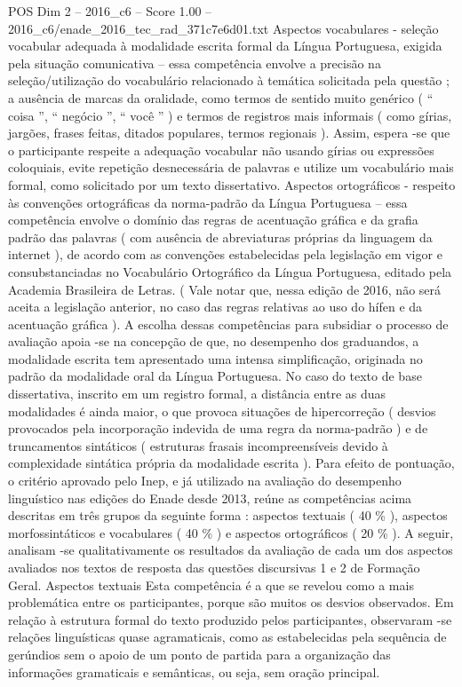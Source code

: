 \begin{textsample}{POS Dim 2 – 2016\_c6 – Score 1.00 – 2016\_c6/enade\_2016\_tec\_rad\_371c7e6d01.txt}
Aspectos vocabulares - seleção vocabular adequada à modalidade escrita formal da Língua Portuguesa, exigida pela situação comunicativa – essa competência envolve a precisão na seleção/utilização do vocabulário relacionado à temática solicitada pela questão ; a ausência de marcas da oralidade, como termos de sentido muito genérico ( “ coisa ”, “ negócio ”, “ você ” ) e termos de registros mais informais ( como gírias, jargões, frases feitas, ditados populares, termos regionais ).
Assim, espera -se que o participante respeite a adequação vocabular não usando gírias ou expressões coloquiais, evite repetição desnecessária de palavras e utilize um vocabulário mais formal, como solicitado por um texto dissertativo.
Aspectos ortográficos - respeito às convenções ortográficas da norma-padrão da Língua Portuguesa – essa competência envolve o domínio das regras de acentuação gráfica e da grafia padrão das palavras ( com ausência de abreviaturas próprias da linguagem da internet ), de acordo com as convenções estabelecidas pela legislação em vigor e consubstanciadas no Vocabulário Ortográfico da Língua Portuguesa, editado pela Academia Brasileira de Letras. ( Vale notar que, nessa edição de 2016, não será aceita a legislação anterior, no caso das regras relativas ao uso do hífen e da acentuação gráfica ).
A escolha dessas competências para subsidiar o processo de avaliação apoia -se na concepção de que, no desempenho dos graduandos, a modalidade escrita tem apresentado uma intensa simplificação, originada no padrão da modalidade oral da Língua Portuguesa.
No caso do texto de base dissertativa, inscrito em um registro formal, a distância entre as duas modalidades é ainda maior, o que provoca situações de hipercorreção ( desvios provocados pela incorporação indevida de uma regra da norma-padrão ) e de truncamentos sintáticos ( estruturas frasais incompreensíveis devido à complexidade sintática própria da modalidade escrita ).
Para efeito de pontuação, o critério aprovado pelo Inep, e já utilizado na avaliação do desempenho linguístico nas edições do Enade desde 2013, reúne as competências acima descritas em três grupos da seguinte forma : aspectos textuais ( 40 \% ), aspectos morfossintáticos e vocabulares ( 40 \% ) e aspectos ortográficos ( 20 \% ).
A seguir, analisam -se qualitativamente os resultados da avaliação de cada um dos aspectos avaliados nos textos de resposta das questões discursivas 1 e 2 de Formação Geral.
Aspectos textuais Esta competência é a que se revelou como a mais problemática entre os participantes, porque são muitos os desvios observados.
Em relação à estrutura formal do texto produzido pelos participantes, observaram -se relações linguísticas quase agramaticais, como as estabelecidas pela sequência de gerúndios sem o apoio de um ponto de partida para a organização das informações gramaticais e semânticas, ou seja, sem oração principal.

\end{textsample}
